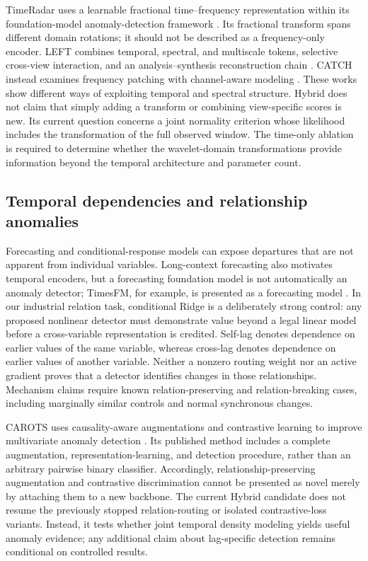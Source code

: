 \documentclass[
  english,
]{article}
\begin{document}
TimeRadar uses a learnable fractional time--frequency representation
within its foundation-model anomaly-detection framework
\citep{timeradar2026}. Its fractional transform spans different domain
rotations; it should not be described as a frequency-only encoder. LEFT
combines temporal, spectral, and multiscale tokens, selective cross-view
interaction, and an analysis--synthesis reconstruction chain
\citep{left2026}. CATCH instead examines frequency patching with
channel-aware modeling \citep{catch2025}. These works show different
ways of exploiting temporal and spectral structure. Hybrid does not
claim that simply adding a transform or combining view-specific scores
is new. Its current question concerns a joint normality criterion whose
likelihood includes the transformation of the full observed window. The
time-only ablation is required to determine whether the wavelet-domain
transformations provide information beyond the temporal architecture and
parameter count.

\subsection{Temporal dependencies and relationship
anomalies}\label{temporal-dependencies-and-relationship-anomalies}

Forecasting and conditional-response models can expose departures that
are not apparent from individual variables. Long-context forecasting
also motivates temporal encoders, but a forecasting foundation model is
not automatically an anomaly detector; TimesFM, for example, is
presented as a forecasting model \citep{timesfm2024}. In our industrial
relation task, conditional Ridge is a deliberately strong control: any
proposed nonlinear detector must demonstrate value beyond a legal linear
model before a cross-variable representation is credited. Self-lag
denotes dependence on earlier values of the same variable, whereas
cross-lag denotes dependence on earlier values of another variable.
Neither a nonzero routing weight nor an active gradient proves that a
detector identifies changes in those relationships. Mechanism claims
require known relation-preserving and relation-breaking cases, including
marginally similar controls and normal synchronous changes.

CAROTS uses causality-aware augmentations and contrastive learning to
improve multivariate anomaly detection \citep{carots2025}. Its published
method includes a complete augmentation, representation-learning, and
detection procedure, rather than an arbitrary pairwise binary
classifier. Accordingly, relationship-preserving augmentation and
contrastive discrimination cannot be presented as novel merely by
attaching them to a new backbone. The current Hybrid candidate does not
resume the previously stopped relation-routing or isolated
contrastive-loss variants. Instead, it tests whether joint temporal
density modeling yields useful anomaly evidence; any additional claim
about lag-specific detection remains conditional on controlled results.
\end{document}
